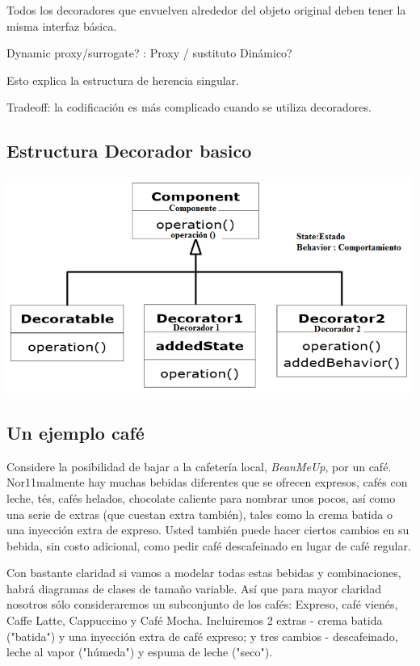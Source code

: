 \documentclass{article}
\begin{document}
Todos los decoradores que envuelven alrededor del objeto original deben tener la misma interfaz básica. \newline

Dynamic proxy/surrogate? : Proxy / sustituto Dinámico?  \newline

Esto explica la estructura de herencia singular.    \newline

Tradeoff:  la codificación es más complicado cuando se utiliza decoradores.

\newpage

\subsection{Estructura Decorador basico}

\includegraphics[width=\textwidth]{PaginaNo73}

\subsection{Un ejemplo café}

Considere la posibilidad de bajar a la cafetería local, \textit{BeanMeUp}, por un café. Nor11malmente hay muchas bebidas diferentes que se ofrecen \-\- expresos, cafés con leche, tés, cafés helados, chocolate caliente para nombrar unos pocos, así como una serie de extras (que cuestan extra también), tales como la crema batida o una inyección extra de expreso. Usted también puede hacer ciertos cambios en su bebida, sin costo adicional, como pedir café descafeinado en lugar de café regular.     \newline

Con bastante claridad si vamos a modelar todas estas bebidas y combinaciones, habrá diagramas de clases de tamaño variable. Así que para mayor claridad nosotros sólo consideraremos un subconjunto de los cafés: Expreso, café vienés, Caffe Latte,
Cappuccino y Café Mocha. 
Incluiremos 2 extras - crema batida ("batida") y una inyección extra de café expreso; y tres cambios - descafeinado, leche al vapor ("húmeda") y espuma de leche ("seco").   \newline
\end{document}
